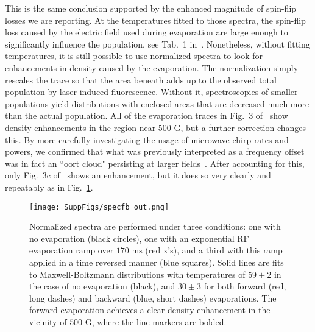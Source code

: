 \documentclass[%
 reprint,
 amsmath,amssymb,
 aps,
pra,
]{revtex4-1}
\begin{document}
This is the same conclusion supported by the enhanced magnitude of spin-flip losses we are reporting.
At the temperatures fitted to those spectra, the spin-flip loss caused by the electric field used during evaporation are large enough to significantly influence the population, see Tab.~1 in~\cite{smt}.
Nonetheless, without fitting temperatures, it is still possible to use normalized spectra to look for enhancements in density caused by the evaporation.
The normalization simply rescales the trace so that the area beneath adds up to the observed total population by laser induced fluorescence. 
Without it, spectroscopies of smaller populations yield distributions with enclosed areas that are decreased much more than the actual population.
All of the evaporation traces in Fig.~3 of~\cite{Stuhl2012evap} show density enhancements in the region near $500\text{ G}$, but a further correction changes this.
By more carefully investigating the usage of microwave chirp rates and powers, we confirmed that what was previously interpreted as a frequency offset was in fact an ``oort cloud" persisting at larger fields~\cite{Inguscio1999}.
After accounting for this, only Fig.~3c of~\cite{Stuhl2012evap} shows an enhancement, but it does so very clearly and repeatably as in Fig.~\ref{fig:normenhance}.

\begin{figure}[tb]
\texttt{[image: SuppFigs/specfb\_out.png]}%
\caption{
Normalized spectra are performed under three conditions: one with no evaporation (black circles), one with an exponential RF evaporation ramp over $170\text{ ms}$ (red x's), and a third with this ramp applied in a time reversed manner (blue squares). Solid lines are fits to Maxwell-Boltzmann distributions with temperatures of $59\pm2$ in the case of no evaporation (black), and $30\pm3$ for both forward (red, long dashes) and backward (blue, short dashes) evaporations. The forward evaporation achieves a clear density enhancement in the vicinity of $500\text{ G}$, where the line markers are bolded. 
}
\label{fig:normenhance}
\end{figure}
\end{document}
